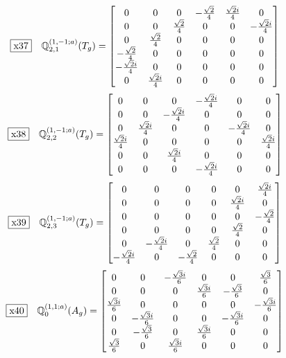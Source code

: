 \documentclass[fleqn,10pt,landscape]{jsarticle}
\begin{document}
\begin{dmath*}
\fbox{x37}\quad \mathbb{Q}_{2,1}^{(1,-1;a)}(T_{g})=\begin{bmatrix} 0 & 0 & 0 & - \frac{\sqrt{2}}{4} & \frac{\sqrt{2} i}{4} & 0 \\ 0 & 0 & \frac{\sqrt{2}}{4} & 0 & 0 & - \frac{\sqrt{2} i}{4} \\ 0 & \frac{\sqrt{2}}{4} & 0 & 0 & 0 & 0 \\ - \frac{\sqrt{2}}{4} & 0 & 0 & 0 & 0 & 0 \\ - \frac{\sqrt{2} i}{4} & 0 & 0 & 0 & 0 & 0 \\ 0 & \frac{\sqrt{2} i}{4} & 0 & 0 & 0 & 0 \end{bmatrix}
\end{dmath*}
\begin{dmath*}
\fbox{x38}\quad \mathbb{Q}_{2,2}^{(1,-1;a)}(T_{g})=\begin{bmatrix} 0 & 0 & 0 & - \frac{\sqrt{2} i}{4} & 0 & 0 \\ 0 & 0 & - \frac{\sqrt{2} i}{4} & 0 & 0 & 0 \\ 0 & \frac{\sqrt{2} i}{4} & 0 & 0 & - \frac{\sqrt{2} i}{4} & 0 \\ \frac{\sqrt{2} i}{4} & 0 & 0 & 0 & 0 & \frac{\sqrt{2} i}{4} \\ 0 & 0 & \frac{\sqrt{2} i}{4} & 0 & 0 & 0 \\ 0 & 0 & 0 & - \frac{\sqrt{2} i}{4} & 0 & 0 \end{bmatrix}
\end{dmath*}
\begin{dmath*}
\fbox{x39}\quad \mathbb{Q}_{2,3}^{(1,-1;a)}(T_{g})=\begin{bmatrix} 0 & 0 & 0 & 0 & 0 & \frac{\sqrt{2} i}{4} \\ 0 & 0 & 0 & 0 & \frac{\sqrt{2} i}{4} & 0 \\ 0 & 0 & 0 & 0 & 0 & - \frac{\sqrt{2}}{4} \\ 0 & 0 & 0 & 0 & \frac{\sqrt{2}}{4} & 0 \\ 0 & - \frac{\sqrt{2} i}{4} & 0 & \frac{\sqrt{2}}{4} & 0 & 0 \\ - \frac{\sqrt{2} i}{4} & 0 & - \frac{\sqrt{2}}{4} & 0 & 0 & 0 \end{bmatrix}
\end{dmath*}
\begin{dmath*}
\fbox{x40}\quad \mathbb{Q}_{0}^{(1,1;a)}(A_{g})=\begin{bmatrix} 0 & 0 & - \frac{\sqrt{3} i}{6} & 0 & 0 & \frac{\sqrt{3}}{6} \\ 0 & 0 & 0 & \frac{\sqrt{3} i}{6} & - \frac{\sqrt{3}}{6} & 0 \\ \frac{\sqrt{3} i}{6} & 0 & 0 & 0 & 0 & - \frac{\sqrt{3} i}{6} \\ 0 & - \frac{\sqrt{3} i}{6} & 0 & 0 & - \frac{\sqrt{3} i}{6} & 0 \\ 0 & - \frac{\sqrt{3}}{6} & 0 & \frac{\sqrt{3} i}{6} & 0 & 0 \\ \frac{\sqrt{3}}{6} & 0 & \frac{\sqrt{3} i}{6} & 0 & 0 & 0 \end{bmatrix}
\end{dmath*}
\end{document}
